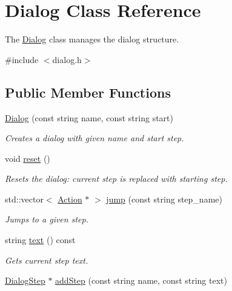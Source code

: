 \hypertarget{classDialog}{
\section{Dialog Class Reference}
\label{classDialog}
}


The \hyperlink{classDialog}{Dialog} class manages the dialog structure.  




{\ttfamily \#include $<$dialog.h$>$}

\subsection*{Public Member Functions}
\begin{DoxyCompactItemize}
\item 
\hyperlink{classDialog_a27a2f01f7fe4daabd8f42a6bfc676183}{Dialog} (const string name, const string start)
\begin{DoxyCompactList}\small\item\em Creates a dialog with given name and start step. \item\end{DoxyCompactList}\item 
\hypertarget{classDialog_a18e4aaf3135e5da9931366fcb904e214}{
void \hyperlink{classDialog_a18e4aaf3135e5da9931366fcb904e214}{reset} ()}
\label{classDialog_a18e4aaf3135e5da9931366fcb904e214}

\begin{DoxyCompactList}\small\item\em Resets the dialog: current step is replaced with starting step. \item\end{DoxyCompactList}\item 
std::vector$<$ \hyperlink{classAction}{Action} $\ast$ $>$ \hyperlink{classDialog_aa4035a36c31562ddf4c05863d81ce8da}{jump} (const string step\_\-name)
\begin{DoxyCompactList}\small\item\em Jumps to a given step. \item\end{DoxyCompactList}\item 
\hypertarget{classDialog_a66bded7f630c4073c427c09cd62c9f44}{
string \hyperlink{classDialog_a66bded7f630c4073c427c09cd62c9f44}{text} () const }
\label{classDialog_a66bded7f630c4073c427c09cd62c9f44}

\begin{DoxyCompactList}\small\item\em Gets current step text. \item\end{DoxyCompactList}\item 
\hypertarget{classDialog_a6d2967445e2d12ba3a907d489edc4255}{
\hyperlink{structDialogStep}{DialogStep} $\ast$ \hyperlink{classDialog_a6d2967445e2d12ba3a907d489edc4255}{addStep} (const string name, const string text)}
\label{classDialog_a6d2967445e2d12ba3a907d489edc4255}


\end{DoxyCompactItemize}
